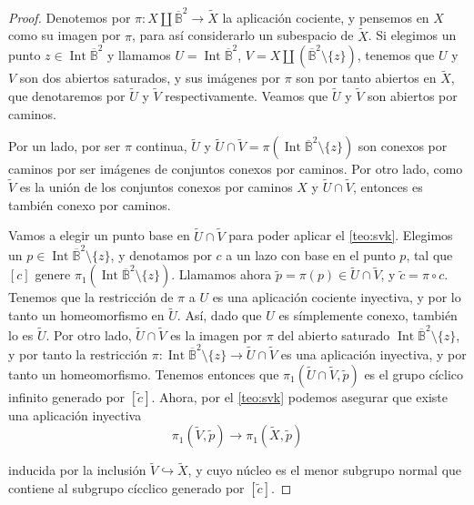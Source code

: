 \documentclass[10pt]{report}
\DeclareMathOperator{\interior}{Int} %
\newcommand{\Disco}{\overline{\mathbb{B}}^2}
\theoremstyle{definition}
\begin{document}
\begin{proof}
Denotemos por $\pi :X\amalg \Disco \to \tilde{X}$ la aplicación cociente, y pensemos en $X$ como su imagen por $\pi$, para así considerarlo un subespacio de $\tilde{X}$.
Si elegimos un punto $z\in \interior{\Disco}$ y llamamos $U=\interior{\Disco}$, $V=X\amalg \left( \Disco \setminus \{ z \} \right)$, tenemos que $U$ y $V$ son dos abiertos saturados, y sus imágenes por $\pi$ son por tanto abiertos en $\tilde{X}$, que denotaremos por $\tilde{U}$ y $\tilde{V}$ respectivamente. Veamos que $\tilde{U}$ y $\tilde{V}$ son abiertos por caminos.

Por un lado, por ser $\pi$ continua, $\tilde{U}$ y $\tilde{U}\cap \tilde{V}=\pi (\interior{\Disco} \setminus \{ z \} ) $ son conexos por caminos por ser imágenes de conjuntos conexos por caminos. Por otro lado, como $\tilde{V}$ es la unión de los conjuntos conexos por caminos $X$ y $\tilde{U} \cap \tilde{V}$, entonces es también conexo por caminos.

Vamos a elegir un punto base en $\tilde{U} \cap \tilde{V}$ para poder aplicar el \autoref{teo:svk}. Elegimos un $p\in \interior{\Disco} \setminus \{ z \}$, y denotamos por $c$ a un lazo con base en el punto $p$, tal que $\left[ c \right]$ genere $\pi_1 (\interior{\Disco} \setminus \{ z \} )$. Llamamos ahora $\tilde{p}=\pi (p) \in \tilde{U} \cap \tilde{V}$, y $\tilde{c} = \pi \circ c$. 
Tenemos que la restricción de $\pi$ a $U$ es una aplicación cociente inyectiva, y por lo tanto un homeomorfismo en $\tilde{U}$. Así, dado que $U$ es símplemente conexo, también lo es $\tilde{U}$. Por otro lado, $\tilde{U} \cap \tilde{V}$ es la imagen por $\pi$ del abierto saturado $\interior{\Disco} \setminus \{ z \}$, y por tanto la restricción $\pi : \interior{\Disco} \setminus \{ z \} \to \tilde{U} \cap \tilde{V}$ es una aplicación inyectiva, y por tanto un homeomorfismo. Tenemos entonces que $\pi_1 (\tilde{U} \cap \tilde{V} , \tilde{p})$ es el grupo cíclico infinito generado por $\left[ \tilde{c} \right]$. Ahora, por el \autoref{teo:svk} podemos asegurar que existe una aplicación inyectiva
\[
\pi_1 (\tilde{V} , \tilde{p} ) \to \pi_1 (\tilde{X} , \tilde{p} )
\]

inducida por la inclusión $\tilde{V} \hookrightarrow \tilde{X}$, y cuyo núcleo es el menor subgrupo normal que contiene al subgrupo cícclico generado por $\left[ \tilde{c} \right]$. 


\end{proof}
\end{document}
